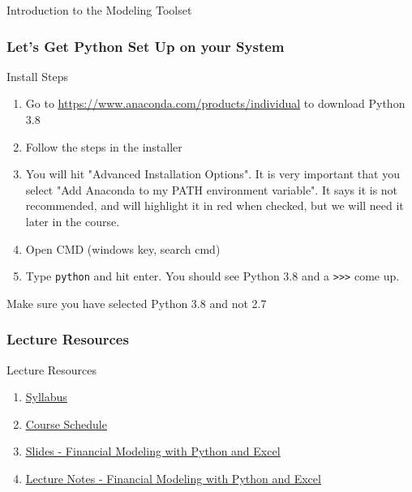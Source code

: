 \documentclass[handout, 11pt]{beamer}
\begin{document}
\begin{section}{Introduction to the Modeling Toolset}
\begin{frame}
\frametitle{Let's Get Python Set Up on your System}
{
\begin{block}{Install Steps}
\small
\begin{enumerate}
\item Go to \textcolor{blue}{\underline{\url{https://www.anaconda.com/products/individual}}} to download Python 3.8
\item Follow the steps in the installer
\item You will hit "Advanced Installation Options". It is very important that you select "Add Anaconda to my PATH environment variable". It says it is not recommended, and will highlight it in red when checked, but we will need it later in the course.
\item Open CMD (windows key, search cmd)
\item Type \texttt{python} and hit enter. You should see Python 3.8 and a \texttt{>>>} come up.
\end{enumerate}
\vfill
\end{block}
}
\begin{alertblock}{}
Make sure you have selected Python 3.8 and not 2.7
\end{alertblock}
\end{frame}
\end{section}
\appendix
{}
\setcounter{finalframe}{\value{framenumber}}
\begin{frame}
\frametitle{Lecture Resources}
{
\begin{block}{Lecture Resources}
\begin{enumerate}
\item \textcolor{blue}{\underline{\href{https://nickderobertis.github.io/fin-model-course/\_static/generated/pdfs/C1 Financial Modeling Syllabus.pdf}{Syllabus}}}
\item \textcolor{blue}{\underline{\href{https://nickderobertis.github.io/fin-model-course/\_static/generated/pdfs/C2 Course Schedule.pdf}{Course Schedule}}}
\item \textcolor{blue}{\underline{\href{https://nickderobertis.github.io/fin-model-course/\_static/generated/pdfs/S1 Financial Modeling with Python and Excel.pdf}{Slides - Financial Modeling with Python and Excel}}}
\item \textcolor{blue}{\underline{\href{https://nickderobertis.github.io/fin-model-course/\_static/generated/pdfs/LN1 Financial Modeling with Python and Excel.pdf}{Lecture Notes - Financial Modeling with Python and Excel}}}
\end{enumerate}
\vfill
\end{block}
}
\label{frames:resources}
\end{frame}
\setcounter{framenumber}{\value{finalframe}}
\end{document}
